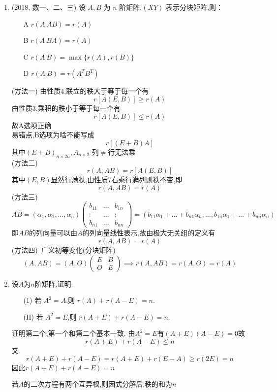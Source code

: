 \documentclass[12pt, a4paper, oneside, UTF8]{ctexbook}
\begin{document}
\begin{enumerate}
    \item (2018, 数一、二、三) 设 $ A, B $ 为 $ n $ 阶矩阵,$ (XY) $ 表示分块矩阵,则：
    \begin{enumerate}
        \item[A] $ r(A\ AB) = r(A) $
        \item[B] $ r(A\ BA) = r(A) $
        \item[C] $ r(A\ B) = \max\{r(A), r(B)\} $
        \item[D] $ r(A\ B) = r(A^T B^T) $
    \end{enumerate}
    
    \begin{solution}
    (方法一) 由性质4,联立的秩大于等于每一个有
    $$
    r\left[A(E,B)\right] \geq r(A)
    $$
    由性质3,乘积的秩小于等于每一个有
    $$
    r\left[A(E,B)\right] \leq r(A)
    $$
    故A选项正确 \\
    易错点,B选项为啥不能写成
    $$
    r\left[(E+B)A\right] 
    $$
    其中$(E+B)_{n\times 2n},A_{n\times 2}$ 列$\neq$行无法乘 \\
    (方法二) 
    $$
    r(A,AB)=r\left[A(E,B)\right]
    $$
    其中$(E,B)$显然\underline{行满秩},由性质7右乘行满列则秩不变,即
    $$
    r(A,AB)=r(A) 
    $$
    (方法三)
    $$
    AB=\left(\alpha_1,\alpha_2,\ldots,\alpha_n\right)\begin{pmatrix}
        b_{11} & \ldots & b_{1n} \\
        \vdots & \ldots & \vdots \\
        b_{n1} & \ldots & b_{nn}
    \end{pmatrix} = \left(b_{11}\alpha_1+\ldots+b_{n1}\alpha_n,\ldots,b_{1n}\alpha_1+\ldots+b_{nn}\alpha_n\right)
    $$
    即$AB$的列向量可以由$A$的列向量线性表示,故由极大无关组的定义有
    $$
    r(A,AB)=r(A)
    $$
    (方法四)\ 广义初等变化(分块矩阵) 
    $$
    (A,AB)=(A,O)\begin{pmatrix}
        E & B \\
        O & E 
    \end{pmatrix} \implies r(A,AB)=r(A,O)=r(A)
    $$
    \end{solution}

    \item 设$A$为$n$阶矩阵,证明:
    \begin{enumerate}
        \item [(1)] 若 $ A^2 = A $,则 $ r(A) + r(A - E) = n $.
        \item [(II)] 若 $ A^2 = E $,则 $ r(A + E) + r(A - E) = n $.
    \end{enumerate}
    
    \begin{solution}
    证明第二个,第一个和第二个基本一致. 由$A^2=E$有$(A+E)(A-E)=0$故
    $$
    r(A+E)+r(A-E)\leq n 
    $$
    又
    $$
    r(A+E)+r(A-E) = r(A+E)+r(E-A) \geq r(2E) = n
    $$
    因此$r(A+E)+r(A-E)=n$
    \end{solution}

    \begin{tcolorbox}
        若$A$的二次方程有两个互异根,则因式分解后,秩的和为$n$
    \end{tcolorbox}
\end{enumerate}
\end{document}
